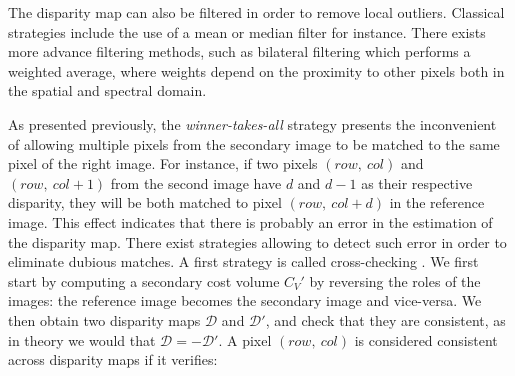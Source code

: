The disparity map can also be filtered in order to remove local outliers. Classical strategies include the use of a mean or median filter for instance. There exists more advance filtering methods, such as bilateral filtering \cite{tomasi_bilateral_1998} which performs a weighted average, where weights depend on the proximity to other pixels both in the spatial and spectral domain.   

As presented previously, the \textit{winner-takes-all} strategy presents the inconvenient of allowing multiple pixels from the secondary image to be matched to the same pixel of the right image. For instance, if two pixels $(row,~col)$ and $(row,~col+1)$ from the second image have $d$ and $d-1$ as their respective disparity, they will be both matched to pixel $(row, ~col+d)$ in the reference image. This effect indicates that there is probably an error in the estimation of the disparity map. There exist strategies allowing to detect such error in order to eliminate dubious matches. A first strategy is called cross-checking \cite{fua_combining_1991}. We first start by computing a secondary cost volume $C_V'$ by reversing the roles of the images: the reference image becomes the secondary image and vice-versa. We then obtain two disparity maps $\mathcal{D}$ and $\mathcal{D}'$, and check that they are consistent, as in theory we would that $\mathcal{D}=-\mathcal{D}'$. A pixel $(row, ~col)$ is considered consistent across disparity maps if it verifies:
